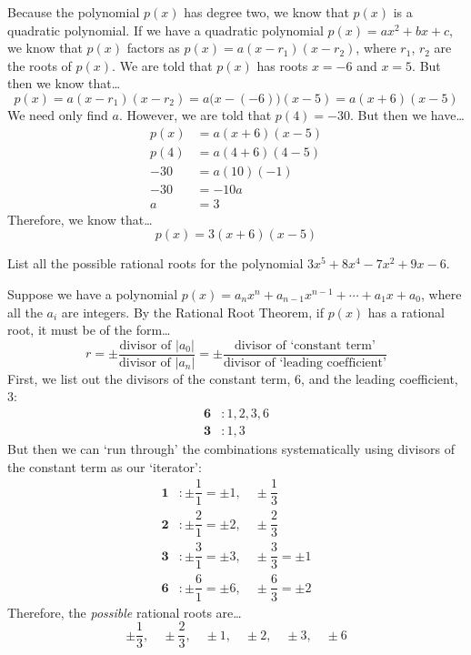 \documentclass[12pt,letterpaper]{exam}
\begin{document}
\begin{questions}
\sol Because the polynomial $p(x)$ has degree two, we know that $p(x)$ is a quadratic polynomial. If we have a quadratic polynomial $p(x)= ax^2 + bx + c$, we know that $p(x)$ factors as $p(x)= a(x - r_1)(x - r_2)$, where $r_1$, $r_2$ are the roots of $p(x)$. We are told that $p(x)$ has roots $x= -6$ and $x= 5$. But then we know that\dots
	\[
	p(x)= a(x - r_1)(x - r_2)= a \big(x - (-6) \big) (x - 5)= a (x + 6)(x - 5)
	\]
We need only find $a$. However, we are told that $p(4)= -30$. But then we have\dots
	\[
	\begin{aligned}
	p(x)&= a (x + 6)(x - 5) \\[0.3cm]
	p(4)&= a (4 + 6)(4 - 5) \\[0.3cm]
	-30&= a (10)(-1) \\[0.3cm]
	-30&= -10a \\[0.3cm]
	a&= 3
	\end{aligned}
	\]
Therefore, we know that\dots
	\[
	p(x)= 3(x + 6)(x - 5)
	\]



\newpage
\question[10] List all the possible rational roots for the polynomial $3x^5 + 8x^4 - 7x^2 + 9x - 6$. \pspace

\sol Suppose we have a polynomial $p(x)= a_n x^n + a_{n-1} x^{n-1} + \cdots + a_1 x + a_0$, where all the $a_i$ are integers. By the Rational Root Theorem, if $p(x)$ has a rational root, it must be of the form\dots
	\[
	r= \pm \dfrac{\text{divisor of } |a_0|}{\text{divisor of } |a_n|}= \pm \dfrac{\text{divisor of `constant term'}}{\text{divisor of `leading coefficient'}}
	\]
First, we list out the divisors of the constant term, $6$, and the leading coefficient, $3$:
	\[
	\begin{aligned}
	\mathbf{6}&\colon 1, 2, 3, 6 \\
	\mathbf{3}&\colon 1, 3
	\end{aligned}
	\]
But then we can `run through' the combinations systematically using divisors of the constant term as our `iterator':
	\[
	\begin{aligned}
	\mathbf{1}&\colon \pm \dfrac{1}{1}= \pm 1,\quad \pm \dfrac{1}{3} \\[0.3cm]
	\mathbf{2}&\colon \pm \dfrac{2}{1}= \pm 2,\quad \pm \dfrac{2}{3} \\[0.3cm]
	\mathbf{3}&\colon \pm \dfrac{3}{1}= \pm 3,\quad \pm \dfrac{3}{3}= \pm 1 \\[0.3cm]
	\mathbf{6}&\colon \pm \dfrac{6}{1}= \pm 6,\quad \pm \dfrac{6}{3}= \pm 2
	\end{aligned}
	\]
Therefore, the \textit{possible} rational roots are\dots
	\[
	\pm \dfrac{1}{3}, \quad \pm \dfrac{2}{3}, \quad \pm 1, \quad \pm 2, \quad \pm 3, \quad \pm 6
	\]


\end{questions}
\end{document}
